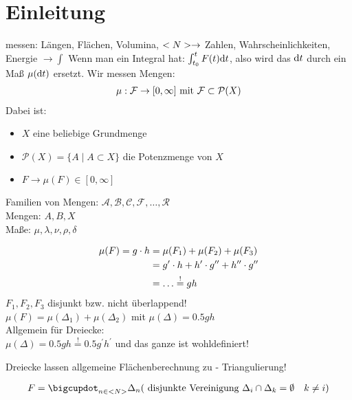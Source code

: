 \chapter{Einleitung}

messen: Längen, Flächen, Volumina, $<N> \to $ Zahlen, Wahrscheinlichkeiten, Energie $\to \int$
Wenn man ein Integral hat: $\int_{t_0}^{t}F(t)\mathrm{d} t$, also wird das $\mathrm{d} t$ durch ein Maß $\mu(\mathrm{d} t)$ ersetzt.
\newline Wir messen Mengen:
\begin{align}
	\mu: \mathcal{F} \to [0,\infty] \text{ mit }\mathcal{F} \subset \mathcal{P}(X) \notag
\end{align}
Dabei ist:
\begin{itemize}
	\item $X$ eine beliebige Grundmenge
	\item $\mathcal{P}(X)=\{A\mid A\subset X\}$ die Potenzmenge von $X$
	\item $F \to \mu(F) \in [0,\infty]$
\end{itemize}
Familien von Mengen: $\mathcal{A}, \mathcal{B}, \mathcal{C}, \mathcal{F}, \dots, \mathcal{R}$\\
Mengen: $A, B, X$\\
Maße: $\mu, \lambda, \nu, \rho, \delta$
\begin{example}[Flächenmessung]
	\begin{align}
		\mu(F) = g \cdot h &= \mu(F_1) + \mu(F_2) + \mu(F_3)\notag\\
		                   &= g^{\prime} \cdot h + h^{\prime}\cdot g^{\prime \prime} + h^{\prime \prime} \cdot g^{\prime \prime}\notag\\
		                   &= \dots \overset{!}{=} gh\notag
	\end{align}
	$F_1, F_2, F_3$ disjunkt bzw. nicht überlappend!\\
	$\mu(F) = \mu(\Delta_1)+\mu(\Delta_2)$ mit $\mu(\Delta) = 0.5 gh$\\ %
	Allgemein für Dreiecke: \\%
	$\mu(\Delta) = 0.5 gh \overset{!}{=} 0.5 g^{\prime}h^{\prime}$ und das ganze ist wohldefiniert!
\end{example}
Dreiecke lassen allgemeine Flächenberechnung zu - Triangulierung!

\begin{align}
	F = \bigcupdot_{n\in \natur} \Delta_n (\text{ disjunkte Vereinigung } \Delta_i \cap \Delta_k = \emptyset \quad k \neq i)\notag
\end{align} %



